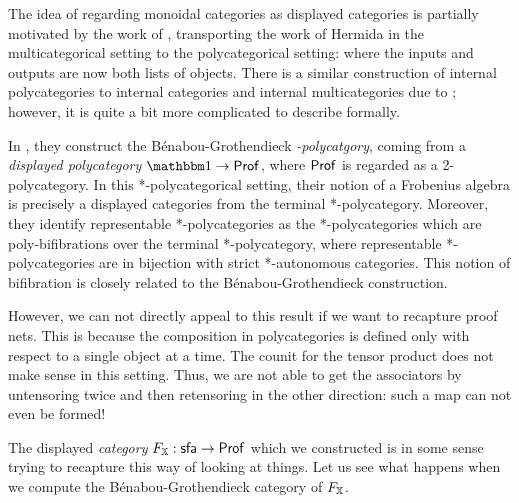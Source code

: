 The idea of regarding monoidal categories as displayed categories is partially motivated by the work of \cite{blanco}, transporting the work of Hermida in the multicategorical setting to the polycategorical setting:  where the inputs and outputs are now both lists of objects.  There is a similar construction of internal polycategories to internal categories and internal multicategories due to \cite{kowlowski}; however, it is quite a bit more complicated to describe formally.  


In \cite{blanco}, they construct the B\'enabou-Grothendieck {\em *-polycatgory}, coming from a {\em displayed polycategory} $\one\to \Prof$, where ${\sf Prof}$ is regarded as a 2-polycategory.  In this *-polycategorical setting, their notion of a Frobenius algebra is precisely  a displayed categories from the terminal *-polycategory.
Moreover, they identify representable *-polycategories as the  *-polycategories which are poly-bifibrations over the terminal *-polycategory, where representable *-polycategories are in bijection with strict *-autonomous categories.  This notion of bifibration is closely related to the B\'enabou-Grothendieck construction. 


However, we can not directly appeal to this result if we want to recapture proof nets.  This is because the composition in polycategories is defined only with respect to a single object at a time. The counit for the tensor product does not make sense in this setting.  Thus, we are not able to get the associators by untensoring twice and then retensoring in the other direction:  such a map can not even be formed!

The displayed {\em category} $F_{\mathbb{X}}:{\sf sfa}\to {\sf Prof}$ which we constructed is in some sense trying to recapture this way of looking at things.  Let us see what happens when we compute the B\'enabou-Grothendieck category of $F_{\mathbb{X}}$.

